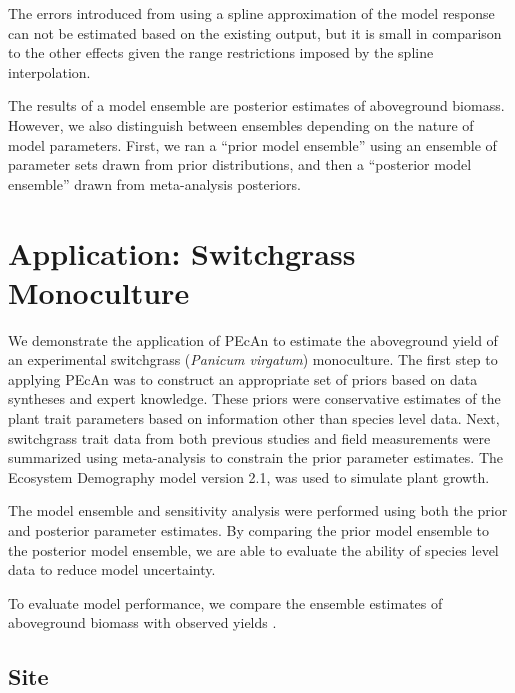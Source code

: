 \documentclass[12pt]{article}
\begin{document}
\begin{flushleft}
\begin{spacing}{1.9}
 The errors introduced from using a spline approximation of the model response can not be estimated based on the existing output, but it is small in comparison to the other effects given the range restrictions imposed by the spline interpolation.

 The results of a model ensemble are posterior estimates of aboveground biomass.
 However, we also distinguish between ensembles depending on the nature of model parameters. 
 First, we ran a ``prior model ensemble'' using an ensemble of parameter sets drawn from prior distributions, and then a ``posterior model ensemble''  drawn from meta-analysis posteriors.

\section*{Application: Switchgrass Monoculture}\label{sec:application}

 We demonstrate the application of PEcAn to estimate the aboveground yield of an experimental switchgrass (\emph{Panicum virgatum}) monoculture.
 The first step to applying PEcAn was to construct an appropriate set of priors based on data syntheses and expert knowledge.
 These priors were conservative estimates of the plant trait parameters based on information other than species level data.
 Next, switchgrass trait data from both previous studies and field measurements were summarized using meta-analysis to constrain the prior parameter estimates.
 The Ecosystem Demography model version 2.1,  \citep{medvigy2009mse,moorcroft2001msv} was used to simulate plant growth.

 The model ensemble and sensitivity analysis were performed using both the prior and posterior parameter estimates.
 By comparing the prior model ensemble to the posterior model ensemble, we are able to evaluate the ability of species level data to reduce model uncertainty.

 To evaluate model performance, we compare the ensemble estimates of aboveground biomass with observed yields \citep[][Figure \ref{fig:ensembledensity}]{heaton2008mub,wang2010qrc}. 

\subsection*{Site}


\end{spacing}
\end{flushleft}
\end{document}
